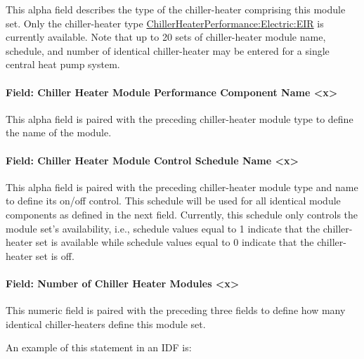 This alpha field describes the type of the chiller-heater comprising this module set. Only the chiller-heater type \hyperref[chillerheaterperformancelectriceir]{ChillerHeaterPerformance:Electric:EIR} is currently available. Note that up to 20 sets of chiller-heater module name, schedule, and number of identical chiller-heater may be entered for a single central heat pump system.

\paragraph{Field: Chiller Heater Module Performance Component Name \textless{}x\textgreater{}}\label{field-chiller-heater-module-performance-component-name-x}

This alpha field is paired with the preceding chiller-heater module type to define the name of the module.

\paragraph{Field: Chiller Heater Module Control Schedule Name \textless{}x\textgreater{}}\label{field-chiller-heater-module-control-schedule-name-x}

This alpha field is paired with the preceding chiller-heater module type and name to define its on/off control. This schedule will be used for all identical module components as defined in the next field. Currently, this schedule only controls the module set's availability, i.e., schedule values equal to 1 indicate that the chiller-heater set is available while schedule values equal to 0 indicate that the chiller-heater set is off.

\paragraph{Field: Number of Chiller Heater Modules \textless{}x\textgreater{}}\label{field-number-of-chiller-heater-modules-x}

This numeric field is paired with the preceding three fields to define how many identical chiller-heaters define this module set.

An example of this statement in an IDF is:

